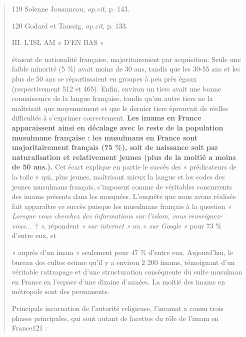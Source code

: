 \begin{quote}
119 Solenne Jouanneau, \emph{op.cit,} p. 143.

120 Godard et Taussig, \emph{op.cit,} p. 133.

III. L'ISL AM « D'EN BAS »

étaient de nationalité française, majoritairement par acquisition. Seule
une faible minorité (5 \%) avait moins de 30 ans, tandis que les 30-55
ans et les plus de 50 ans se répartissaient en groupes à peu près égaux
(respectivement 512 et 465). Enfin, environ un tiers avait une bonne
connaissance de la langue française, tandis qu'un autre tiers ne la
maîtrisait que moyennement et que le dernier tiers éprouvait de réelles
difficultés à s'exprimer correctement. \textbf{Les imams en France
apparaissent ainsi en décalage avec le reste de la population musulmane
française : les musulmans en France sont majoritairement français (75
\%), soit de naissance soit par naturalisation et relativement jeunes
(plus de la moitié a moins de 50 ans.).} Cet écart explique en partie le
succès des « prédicateurs de la toile » qui, plus jeunes, maîtrisant
mieux la langue et les codes des jeunes musulmans français, s'imposent
comme de véritables concurrents des imams présents dans les mosquées.
L'enquête que nous avons réalisée fait apparaître ce succès puisque les
musulmans français à la question \emph{« Lorsque vous cherchez des
informations sur l'islam, vous renseignez- vous... ? »,} répondent
\emph{« sur internet »} ou \emph{« sur Google »} pour 73 \% d'entre eux,
et

« auprès d'un imam » seulement pour 47 \% d'entre eux. Aujourd'hui, le
bureau des cultes estime qu'il y a environ 2 200 imams, témoignant d'un
véritable rattrapage et d'une structuration conséquente du culte
musulman en France en l'espace d'une dizaine d'années. La moitié des
imams en métropole sont des permanents.

Principale incarnation de l'autorité religieuse, l'imamat a connu trois
phases principales, qui sont autant de facettes du rôle de l'imam en
France121 :
\end{quote}

